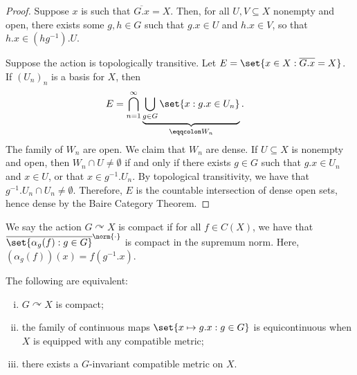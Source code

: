 \documentclass[10pt]{mypackage}
\renewcommand{\eqcolon}{\eqqcolon}
\begin{document}
\begin{proof}
  Suppose $x$ is such that $ \overline{G.x} = X $. Then, for all $U,V\subseteq X$ nonempty and open, there exists some $g,h\in G$ such that $g.x\in U$ and $h.x\in V$, so that $h.x\in \left( hg^{-1} \right).U$.

  Suppose the action is topologically transitive. Let $E = \set{x\in X : \overline{G.x}=X}$. If $\left( U_n \right)_n$ is a basis for $X$, then
  \begin{align*}
    E &= \bigcap_{n=1}^{\infty}\underbrace{\bigcup_{g\in G} \set{x : g.x\in U_n}}_{\eqcolon W_n}.
  \end{align*}
  The family of $W_n$ are open. We claim that $W_n$ are dense. If $U\subseteq X$ is nonempty and open, then $W_n\cap U\neq \emptyset$ if and only if there exists $g\in G$ such that $g.x\in U_n$ and $x\in U$, or that $x\in g^{-1}.U_n$. By topological transitivity, we have that $g^{-1}.U_n\cap U_n\neq \emptyset$. Therefore, $E$ is the countable intersection of dense open sets, hence dense by the Baire Category Theorem.
\end{proof}
\begin{definition}
  We say the action $G\curvearrowright X$ is compact if for all $f\in C(X)$, we have that $ \overline{\set{\alpha_g(f) : g\in G}}^{\norm{\cdot}} $ is compact in the supremum norm. Here, $\left( \alpha_g(f) \right)\left( x \right) = f\left( g^{-1}.x \right)$.
\end{definition}
\begin{proposition}
  The following are equivalent:
  \begin{enumerate}[(i)]
    \item $G\curvearrowright X$ is compact;
    \item the family of continuous maps $\set{x\mapsto g.x : g\in G}$ is equicontinuous when $X$ is equipped with any compatible metric;
    \item there exists a $G$-invariant compatible metric on $X$.
  \end{enumerate}
\end{proposition}
\end{document}
